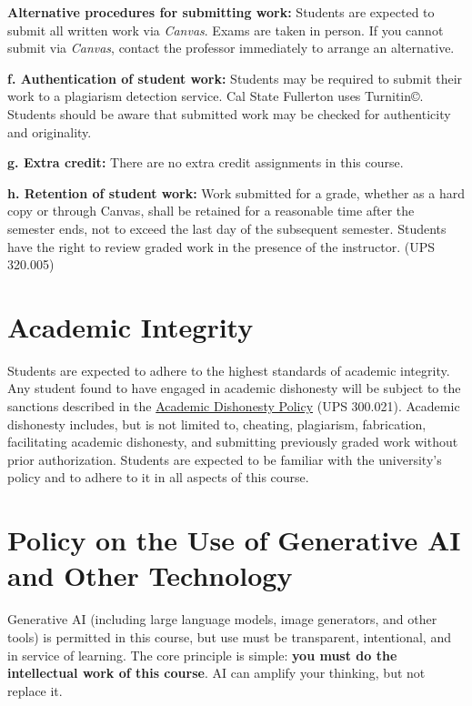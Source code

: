 \documentclass[12pt]{article}
\begin{document}
\vspace{0.5em}
\noindent \textbf{Alternative procedures for submitting work:}
Students are expected to submit all written work via \emph{Canvas}. Exams are taken in person. If you cannot submit via \emph{Canvas}, contact the professor immediately to arrange an alternative.

\vspace{1em}
\noindent \textbf{f. Authentication of student work:}
Students may be required to submit their work to a plagiarism detection service. Cal State Fullerton uses Turnitin\copyright. Students should be aware that submitted work may be checked for authenticity and originality.

\vspace{1em}
\noindent \textbf{g. Extra credit:}
There are no extra credit assignments in this course.

\vspace{1em}
\noindent \textbf{h. Retention of student work:}
Work submitted for a grade, whether as a hard copy or through Canvas, shall be retained for a reasonable time after the semester ends, not to exceed the last day of the subsequent semester. Students have the right to review graded work in the presence of the instructor. (UPS 320.005)

\section*{Academic Integrity}
Students are expected to adhere to the highest standards of academic integrity. Any student found to have engaged in academic dishonesty will be subject to the sanctions described in the \href{https://www.fullerton.edu/senate/publications_policies_resolutions/ups/UPS\%20300/UPS\%20300.021.pdf}{Academic Dishonesty Policy} (UPS 300.021). Academic dishonesty includes, but is not limited to, cheating, plagiarism, fabrication, facilitating academic dishonesty, and submitting previously graded work without prior authorization. Students are expected to be familiar with the university's policy and to adhere to it in all aspects of this course.

\section*{Policy on the Use of Generative AI and Other Technology}

Generative AI (including large language models, image generators, and other tools) is permitted in this course, but use must be transparent, intentional, and in service of learning. The core principle is simple: \textbf{you must do the intellectual work of this course}. AI can amplify your thinking, but not replace it.
\end{document}
